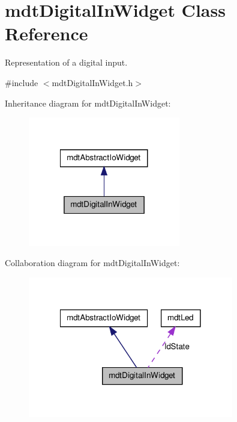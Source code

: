 \hypertarget{classmdt_digital_in_widget}{
\section{mdtDigitalInWidget Class Reference}
\label{classmdt_digital_in_widget}
}


Representation of a digital input.  




{\ttfamily \#include $<$mdtDigitalInWidget.h$>$}



Inheritance diagram for mdtDigitalInWidget:\nopagebreak
\begin{figure}[H]
\begin{center}
\leavevmode
\includegraphics[width=188pt]{classmdt_digital_in_widget__inherit__graph}
\end{center}
\end{figure}


Collaboration diagram for mdtDigitalInWidget:
\nopagebreak
\begin{figure}[H]
\begin{center}
\leavevmode
\includegraphics[width=254pt]{classmdt_digital_in_widget__coll__graph}
\end{center}
\end{figure}
